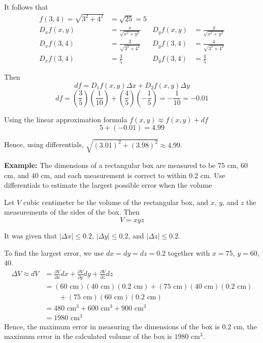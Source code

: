 \documentclass{article}
\begin{document}
\begin{enumerate}[start=1,label={\bfseries Theorem \arabic*:}, wide = 0pt]
It follows that
\begin{align*}
    f(3,4) = \sqrt{3^2+4^2} &= \sqrt{25} = 5 \\[5pt]
    D_x f(x,y) &= \frac{x}{\sqrt{x^2+y^2}} & D_y f(x,y) &= \frac{y}{\sqrt{x^2+y^2}} \\
    D_x f(3,4) &= \frac{3}{\sqrt{3^2+4^2}} & D_y f(3,4) &= \frac{4}{\sqrt{3^2+4^2}} \\
    D_x f(3,4) &= \frac{3}{5} & D_y f(3,4) &= \frac{4}{5}
\end{align*}

Then
\[df = D_1f(x,y) \Delta x + D_2f(x,y) \Delta y\]
\[df = \left(\frac{3}{5}\right) \left( \frac{1}{10}\right) + \left( \frac{4}{5} \right) \left( -\frac{1}{5} \right) = -\frac{1}{10}=-0.01\] 

Using the linear approximation formula $f(x,y) \approx f(x,y) + df$
\[5+(-0.01)=4.99\]

Hence, using differentials, $\sqrt{(3.01)^2+(3.98)^2} \approx 4.99$.

\textbf{Example: } The dimensions of a rectangular box are measured to be
$75$ cm, $60$ cm, and $40$ cm, and each measurement is
correct to within $0.2$ cm. Use differentials to estimate
the largest possible error when the volume

Let $V$ cubic centimeter be the volume of the rectangular box, and $x$, $y$, and $z$ the measurements of the sides of the box. Then
\[V=xyz\]

It was given that $\lvert \Delta x \rvert \leq 0.2$, $\lvert \Delta y \rvert \leq 0.2$, and $\lvert \Delta z \rvert \leq 0.2$.

To find the largest error, we use $dx=dy=dz=0.2$ together with $x=75$, $y=60$, $40$.
\begin{align*}
    \Delta V \approx dV &= \frac{\partial V}{\partial x} dx + \frac{\partial V}{\partial y} dy + \frac{\partial V}{\partial z} dz \\
    &= (60 \text{ cm})(40 \text{ cm})(0.2 \text{ cm})+(75 \text{ cm})(40 \text{ cm})(0.2 \text{ cm}) \\
    & \qquad +(75 \text{ cm})(60 \text{ cm})(0.2 \text{ cm}) \\
    &= 480 \text{ cm}^3 + 600 \text{ cm}^3 + 900 \text{ cm}^3 \\
    &= 1980 \text{ cm}^3
\end{align*}
Hence, the maximum error in measuring the dimensions of the box is $0.2 \text{ cm}$, the maximum error in the calculated volume of the box is $1980 \text{ cm}^3$.
\end{enumerate}
\end{document}
